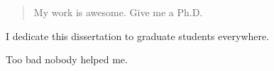 \documentclass[12pt]{myucthesis}
\begin{document}
\ssp %

\maketitle
\copyrightpage

\begin{abstract}
My work is awesome. Give me a Ph.D.
\end{abstract}

\begin{frontmatter}
\renewcommand{\thepage}{\roman{page}}
\setcounter{page}{1}

\begin{dedication}
\null\vfil
{\large
\begin{center}
I dedicate this dissertation to graduate students everywhere.
\end{center}}
\null\vfil
\end{dedication}

\tableofcontents
\listoffigures %
\listoftables %


\begin{acknowledgements}
Too bad nobody helped me.
\end{acknowledgements}

\clearpage

\end{frontmatter}


{}
\end{document}
